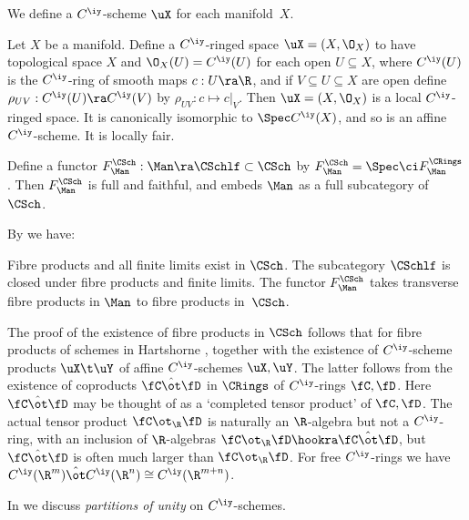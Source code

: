 \documentclass{article}
\begin{document}
We define a $C^\iy$-scheme $\uX$ for each manifold~$X$.

\begin{ex} Let $X$ be a manifold. Define a $C^\iy$-ringed space
$\uX=(X,\O_X)$ to have topological space $X$ and $\O_X(U)=C^\iy(U)$
for each open $U\subseteq X$, where $C^\iy(U)$ is the $C^\iy$-ring
of smooth maps $c:U\ra\R$, and if $V\subseteq U\subseteq X$ are open
define $\rho_{UV}:C^\iy(U)\ra C^\iy(V)$ by $\rho_{UV}:c\mapsto
c\vert_V$. Then $\uX=(X,\O_X)$ is a local $C^\iy$-ringed space. It
is canonically isomorphic to $\Spec C^\iy(X)$, and so is an affine
$C^\iy$-scheme. It is locally fair.

Define a functor $F_\Man^\CSch:\Man\ra\CSchlf\subset\CSch$ by
$F_\Man^\CSch=\Spec\ci F_\Man^\CRings$. Then $F_\Man^\CSch$ is full
and faithful, and embeds $\Man$
as a full subcategory of $\CSch$.
\label{ds2ex2}
\end{ex}

By \cite[Cor.~4.21 \& Th.~4.33]{Joyc4} we have:

\begin{thm} Fibre products and all finite limits exist in\/
$\CSch$. The subcategory $\CSchlf$ is closed under fibre products
and finite limits. The functor\/ $F_\Man^\CSch$ takes transverse
fibre products in $\Man$ to fibre products in\/~$\CSch$.
\label{ds2thm1}
\end{thm}

The proof of the existence of fibre products in $\CSch$ follows that
for fibre products of schemes in Hartshorne \cite[Th.~II.3.3]{Hart},
together with the existence of $C^\iy$-scheme products $\uX\t\uY$ of
affine $C^\iy$-schemes $\uX,\uY$. The latter follows from the
existence of coproducts $\fC\hat\ot\fD$ in $\CRings$ of
$C^\iy$-rings $\fC,\fD$. Here $\fC\hat\ot\fD$ may be thought of as a
`completed tensor product' of $\fC,\fD$. The actual tensor product
$\fC\ot_\R\fD$ is naturally an $\R$-algebra but not a $C^\iy$-ring,
with an inclusion of $\R$-algebras $\fC\ot_\R\fD\hookra
\fC\hat\ot\fD$, but $\fC\hat\ot\fD$ is often much larger than
$\fC\ot_\R\fD$. For free $C^\iy$-rings we have~$C^\iy(\R^m)\hat\ot
C^\iy(\R^n)\cong C^\iy(\R^{m+n})$.

In \cite[Def.~4.34 \& Prop.~4.35]{Joyc4} we discuss {\it partitions
of unity\/} on $C^\iy$-schemes.
\end{document}
